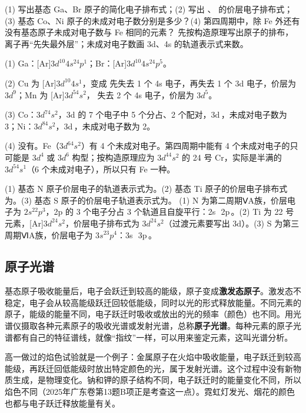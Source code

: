 \begin{liti}[典型]
(1) 写出基态 Ga、Br 原子的简化电子排布式；(2) 写出 、 的价层电子排布式；(3) 基态 Co、Ni 原子的未成对电子数分别是多少？(4) 第四周期中，除 Fe 外还有没有基态原子未成对电子数与 Fe 相同的元素？
\tcblower
\silu 先按构造原理写出原子的排布，离子再“先失最外层”；未成对电子数画 3d、4s 的轨道表示式来数。\par
\jie (1) Ga：[Ar]$3d^{10}4s^24p^1$；Br：[Ar]$3d^{10}4s^24p^5$。\par
(2) Cu 为 [Ar]$3d^{10}4s^1$，变成  先失去 1 个 4s 电子，再失去 1 个 3d 电子，价层为 $3d^9$；Mn 为 [Ar]$3d^54s^2$， 失去 2 个 4s 电子，价层为 $3d^5$。\par
(3) Co：$3d^74s^2$，3d 的 7 个电子中 5 个分占、2 个配对，3d\,，未成对电子数为 3；Ni：$3d^84s^2$，3d\,，未成对电子数为 2。\par
(4) 没有。Fe（$3d^64s^2$）有 4 个未成对电子。第四周期中能有 4 个未成对电子的只可能是 $3d^4$ 或 $3d^6$ 构型；按构造原理应为 $3d^44s^2$ 的 24 号 Cr，实际是半满的 $3d^54s^1$（6 个未成对电子），所以只有 Fe 一种。
\end{liti}

\begin{liti}[电子排布基础练习]
(1) 基态 N 原子价层电子的轨道表示式为\tk[5em]。(2) 基态 Ti 原子的价层电子排布式为\tk[5em]。(3) 基态 S 原子的价层电子轨道表示式为\tk[5em]。
\tcblower
\jie (1) N 为第二周期ⅤA族，价层电子为 $2s^22p^3$，2p 的 3 个电子分占 3 个轨道且自旋平行：2s\,\ 2p\,。(2) Ti 为 22 号元素，[Ar]$3d^24s^2$，价层电子排布式为 $3d^24s^2$（过渡元素要写出 3d）。(3) S 为第三周期ⅥA族，价层电子为 $3s^23p^4$：3s\,\ 3p\,。
\end{liti}

\subsection{原子光谱}
基态原子吸收能量后，电子会跃迁到较高的能级，原子变成\textbf{激发态原子}。激发态不稳定，电子会从较高能级跃迁回较低能级，同时以光的形式释放能量。不同元素的原子，能级的能量不同，电子跃迁时吸收或放出的光的频率（颜色）也不同。用光谱仪摄取各种元素原子的吸收光谱或发射光谱，总称\textbf{原子光谱}。每种元素的原子光谱都有自己的特征谱线，就像“指纹”一样，可以用来鉴定元素，这叫光谱分析。

高一做过的焰色试验就是一个例子：金属原子在火焰中吸收能量，电子跃迁到较高能级，再跃迁回低能级时放出特定颜色的光，属于发射光谱。这个过程中没有新物质生成，是物理变化。钠和钾的原子结构不同，电子跃迁时的能量变化不同，所以焰色不同（2025年广东卷第13题B项正是考查这一点）。霓虹灯发光、烟花的颜色也都与电子跃迁释放能量有关。

